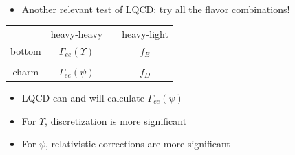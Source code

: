 \documentclass[landscape]{article}
\newenvironment{slide}[1][ ]{\mbox{\bf \boldmath #1 } \vfill}{\vfill \vspace{-1.5 cm} \mbox{ } \pagebreak}
\newenvironment{itemizer}[1]{\begin{itemize}\setlength{\itemsep}{#1}}{\end{itemize}}
\begin{document}
\begin{slide}

\begin{itemize}

  \item Another relevant test of LQCD: try all the flavor combinations!

\end{itemize}

\vfill

\begin{center}
  \renewcommand{\arraystretch}{2}
  \begin{tabular}{c c c c}
    & heavy-heavy & \mbox{\hspace{1 cm}} & heavy-light \\
    bottom \mbox{\hspace{1 cm}} & $\Gamma_{ee}(\Upsilon)$ & & $f_B$ \\
    & & & \\
    charm \mbox{\hspace{1 cm}} & $\Gamma_{ee}(\psi)$ & & $f_D$ \\
  \end{tabular}
\end{center}

\vfill
\begin{itemizer}{1 cm}

  \item LQCD can and will calculate $\Gamma_{ee}(\psi)$

  \item For $\Upsilon$, discretization is more significant

  \item For $\psi$, relativistic corrections are more significant

\end{itemizer}

\vspace{1 cm}

\end{slide}
\end{document}
